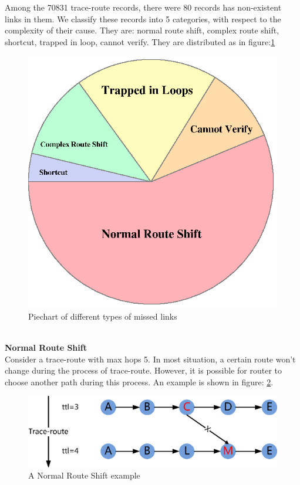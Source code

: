 \documentclass[conference, twocolumn, oneside, 10pt]{IEEEtran}
\begin{document}
Among the 70831 trace-route records, there were 80 records has non-existent links
in them. 
We classify these records into 5 categories, with respect to the complexity of
their cause. They are: normal route shift, complex route shift, shortcut,
trapped in loop, cannot verify. They are distributed as in
figure:\ref{fig:PieChart}\\
\begin{figure}[h!]
  \centering
  \includegraphics[scale=0.8]{plot/PieChart.eps}
  \caption{Piechart of different types of missed links}
  \label{fig:PieChart}
\end{figure}\\
\textbf{Normal Route Shift}\\
Consider a trace-route with max hops 5. In most situation, a certain route won't
change during the process of trace-route. However, it is possible for router to
choose another path during this process. An example is shown in figure:
\ref{fig:NormalRouteShift}.\\
\begin{figure}[h!]
  \centering
  \includegraphics[scale=0.5]{plot/RouteShift.eps}
  \caption{A Normal Route Shift example}
  \label{fig:NormalRouteShift}
\end{figure}\\
\end{document}
